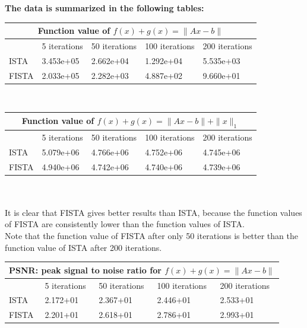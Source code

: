 \documentclass[12pt]{article}
\begin{document}
\textbf{The data is summarized in the following tables:}\\

\begin{tabular}{ |p{1.5cm}|p{2.5cm}|p{2.5cm}|p{2.5cm}|p{2.5cm}|  }
 \hline
 \multicolumn{5}{|c|}{Function value of $f(x)+g(x)=\|Ax-b\|$} \\
 \hline
  & 5 iterations & 50 iterations & 100 iterations & 200 iterations\\
 \hline
 ISTA  & 3.453e+05 & 2.662e+04    & 1.292e+04   & 5.535e+03\\
 FISTA &  2.033e+05 & 2.282e+03    & 4.887e+02   & 9.660e+01\\
 \hline
\end{tabular} 
\\

\begin{tabular}{ |p{1.5cm}|p{2.5cm}|p{2.5cm}|p{2.5cm}|p{2.5cm}|  }
 \hline
 \multicolumn{5}{|c|}{Function value of $f(x)+g(x)=\|Ax-b\|+ \|x\|_1$} \\
 \hline
  & 5 iterations & 50 iterations & 100 iterations & 200 iterations\\
 \hline

 ISTA  &  5.079e+06 & 4.766e+06    & 4.752e+06   & 4.745e+06\\
 FISTA &   4.940e+06 & 4.742e+06    & 4.740e+06   & 4.739e+06\\
 \hline
\end{tabular} \\
\\It is clear that FISTA gives better results than ISTA, because the function values of FISTA are consistently lower than the function values of ISTA.\\ 
Note that the function value of FISTA after only 50 iterations is better than the function value of ISTA after 200 iterations. \\


\begin{tabular}{ |p{1.5cm}|p{2.5cm}|p{2.5cm}|p{2.5cm}|p{2.5cm}|  }
 \hline
 \multicolumn{5}{|c|}{PSNR: peak signal to noise ratio for $f(x)+g(x)=\|Ax-b\|$} \\
 \hline
  & 5 iterations & 50 iterations & 100 iterations & 200 iterations\\
 \hline
 ISTA  & 2.172+01 & 2.367+01 & 2.446+01 & 2.533+01\\
 FISTA & 2.201+01 & 2.618+01 & 2.786+01 & 2.993+01\\
 \hline
\end{tabular} 
\\
\end{document}
